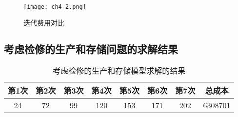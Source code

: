 \begin{figure}[H]
    \centering
    \texttt{[image: ch4-2.png]}
    \caption{迭代费用对比}
    \label{f.ch4-2}
\end{figure}


\subsection{考虑检修的生产和存储问题的求解结果}
\begin{table}[h]
    \renewcommand\arraystretch{1.5} 
    \centering
    \caption{考虑检修的生产和存储模型求解的结果}
    \label{T.ch4-1}
    \xiaowu
    \begin{tabular}{|c|c|c|c|c|c|c|c|}
    \hline
    \textbf{第1次} & \textbf{第2次} & \textbf{第3次} & \textbf{第4次} & \textbf{第5次} & \textbf{第6次} & \textbf{第7次} & \textbf{总成本} \\ \hline
    24  & 72 & 99 & 120 & 153 & 171 & 202 & 6308701 \\ \hline
    \end{tabular}
\end{table}

